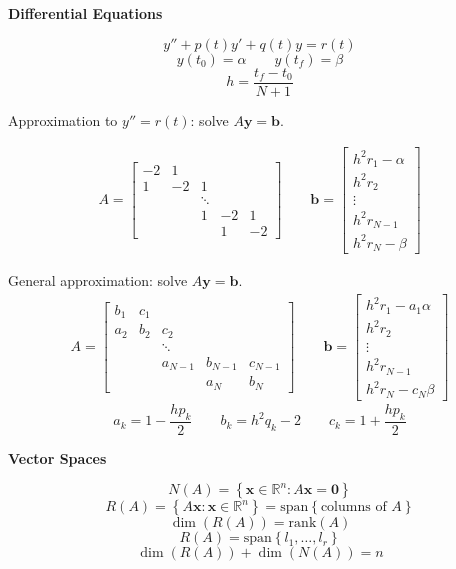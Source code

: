 \documentclass[10pt]{article}
\newcommand\sectionheading[1]{\begin{center}\large{\textbf{#1}}\end{center}\normalsize}
\newcommand{\R}{{\mathbb R}}
\newcommand{\rank}{\mathrm{rank}}
\newcommand{\vspan}{\mathrm{span}}
\newcommand{\bv}[1]{\mathbf{#1}}                                %
\newcommand{\x}{\bv x}
\newcommand{\y}{\bv y}
\renewcommand{\b}{\bv b}
\newcommand{\set}[1]{\left\{ #1\right\}}
\begin{document}
\begin{multicols*}{2}
\sectionheading{Differential Equations}
\[y''+p(t)y'+q(t)y=r(t)\]
\[y(t_0)=\alpha\qquad y(t_f)=\beta\]
\[h=\frac{t_f-t_0}{N+1}\]

Approximation to $y''=r(t)$: solve $A\y=\b$.

\[\begin{split}
A = \begin{bmatrix}
-2 & 1 & & & \\
1 & -2 & 1 & & \\
& & \ddots & & \\
& & 1 & -2 & 1 \\
& & & 1 & -2
\end{bmatrix}
\qquad
\b =
\begin{bmatrix}
h^2 r_1 - \alpha \\ h^2 r_2 \\ \vdots \\ h^2 r_{N-1} \\ h^2 r_N - \beta
\end{bmatrix}
\end{split}\]

General approximation: solve $A\y=\b$.
\[\begin{split}
A = \begin{bmatrix}
b_1 & c_1 & & & \\
a_2 & b_2 & c_2 & & \\
& & \ddots & & \\
& & a_{N-1} & b_{N-1} & c_{N-1} \\
& & & a_N & b_N
\end{bmatrix}
\qquad
\b =
\begin{bmatrix}
h^2 r_1 -a_1 \alpha \\ h^2 r_2 \\ \vdots \\ h^2 r_{N-1} \\ h^2 r_N - c_N \beta
\end{bmatrix}
\end{split}\]
\[a_k = 1 - \frac{h p_k}{2}
\qquad
b_k = h^2q_k - 2
\qquad
c_k = 1 + \frac{h p_k}{2}\]

\sectionheading{Vector Spaces}
\[N(A)=\set{\x\in\R^n: A\x=\bv 0}\]
\[R(A)=\set{A\x:\x\in\R^n}=\vspan\set{\text{columns of }A}\]
\[\dim(R(A))=\rank(A)\]
\[R(A)=\vspan\set{l_1,\ldots,l_r}\]
\[\dim(R(A))+\dim(N(A))=n\]

\end{multicols*}
\end{document}
